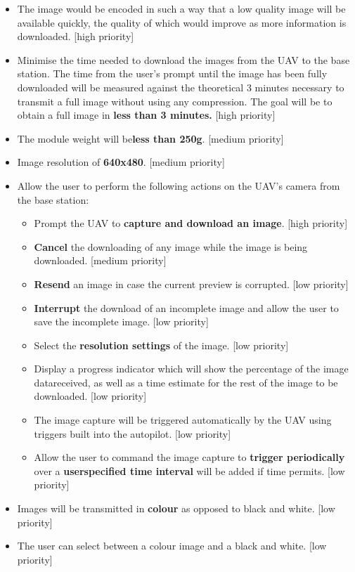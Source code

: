 \documentclass[oneside]{ecsgdp}         %
\begin{document}
\begin{itemize}
	\item The image would be encoded in such a way that a low quality image will be available quickly, the quality of which would improve as more information is downloaded. [high priority]
	\item Minimise the time needed to download the images from the UAV to the base station. The time from the user’s prompt until the image has been fully downloaded will be measured against the theoretical 3 minutes necessary to transmit a full image without using any compression. The goal will be to obtain a full image in \textbf{less than 3 minutes.} [high priority]
	\item The module weight will be\textbf{less than 250g}. [medium priority]
	\item Image resolution of \textbf{640x480}. [medium priority]
	\item Allow the user to perform the following actions on the UAV’s camera from the base station:
	\begin{itemize}
		\item Prompt the UAV to \textbf{capture and download an image}. [high priority]
		\item \textbf{Cancel} the downloading of any image while the image is being downloaded. [medium priority]
		\item \textbf{Resend} an image in case the current preview is corrupted. [low priority]
		\item \textbf{Interrupt} the download of an incomplete image and allow the user to save the incomplete image. [low priority]
		\item Select the \textbf{resolution settings} of the image. [low priority]
		\item Display a progress indicator which will show the percentage of the image datareceived, as well as a time estimate for the rest of the image to be downloaded. [low priority]
		\item The image capture will be triggered automatically by the UAV using triggers built into the autopilot. [low priority]
		\item Allow the user to command the image capture to \textbf{trigger periodically} over a \textbf{userspecified time interval} will be added if time permits. [low priority]
	\end{itemize}
	\item Images will be transmitted in \textbf{colour} as opposed to black and white. [low priority]
	\item The user can select between a colour image and a black and white. [low priority]
\end{itemize}
\end{document}
